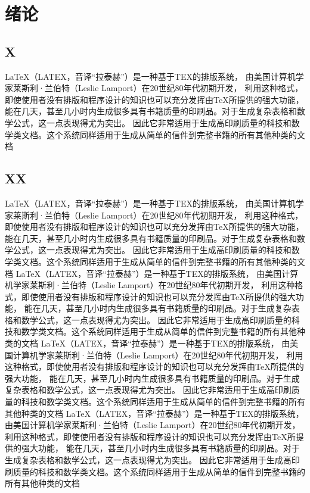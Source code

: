 
\chapter{绪\quad 论}
\section{X}
LaTeX（LATEX，音译“拉泰赫”）是一种基于ΤΕΧ的排版系统，
由美国计算机学家莱斯利·兰伯特（Leslie Lamport）在20世纪80年代初期开发，
利用这种格式，即使使用者没有排版和程序设计的知识也可以充分发挥由TeX所提供的强大功能，
能在几天，甚至几小时内生成很多具有书籍质量的印刷品。对于生成复杂表格和数学公式，这一点表现得尤为突出。
因此它非常适用于生成高印刷质量的科技和数学类文档。这个系统同样适用于生成从简单的信件到完整书籍的所有其他种类的文档

\section{XX}
LaTeX（LATEX，音译“拉泰赫”）是一种基于ΤΕΧ的排版系统，
由美国计算机学家莱斯利·兰伯特（Leslie Lamport）在20世纪80年代初期开发，
利用这种格式，即使使用者没有排版和程序设计的知识也可以充分发挥由TeX所提供的强大功能，
能在几天，甚至几小时内生成很多具有书籍质量的印刷品。对于生成复杂表格和数学公式，这一点表现得尤为突出。
因此它非常适用于生成高印刷质量的科技和数学类文档。这个系统同样适用于生成从简单的信件到完整书籍的所有其他种类的文档
LaTeX（LATEX，音译“拉泰赫”）是一种基于ΤΕΧ的排版系统，
由美国计算机学家莱斯利·兰伯特（Leslie Lamport）在20世纪80年代初期开发，
利用这种格式，即使使用者没有排版和程序设计的知识也可以充分发挥由TeX所提供的强大功能，
能在几天，甚至几小时内生成很多具有书籍质量的印刷品。对于生成复杂表格和数学公式，这一点表现得尤为突出。
因此它非常适用于生成高印刷质量的科技和数学类文档。这个系统同样适用于生成从简单的信件到完整书籍的所有其他种类的文档
LaTeX（LATEX，音译“拉泰赫”）是一种基于ΤΕΧ的排版系统，
由美国计算机学家莱斯利·兰伯特（Leslie Lamport）在20世纪80年代初期开发，
利用这种格式，即使使用者没有排版和程序设计的知识也可以充分发挥由TeX所提供的强大功能，
能在几天，甚至几小时内生成很多具有书籍质量的印刷品。对于生成复杂表格和数学公式，这一点表现得尤为突出。
因此它非常适用于生成高印刷质量的科技和数学类文档。这个系统同样适用于生成从简单的信件到完整书籍的所有其他种类的文档
LaTeX（LATEX，音译“拉泰赫”）是一种基于ΤΕΧ的排版系统，
由美国计算机学家莱斯利·兰伯特（Leslie Lamport）在20世纪80年代初期开发，
利用这种格式，即使使用者没有排版和程序设计的知识也可以充分发挥由TeX所提供的强大功能，
能在几天，甚至几小时内生成很多具有书籍质量的印刷品。对于生成复杂表格和数学公式，这一点表现得尤为突出。
因此它非常适用于生成高印刷质量的科技和数学类文档。这个系统同样适用于生成从简单的信件到完整书籍的所有其他种类的文档